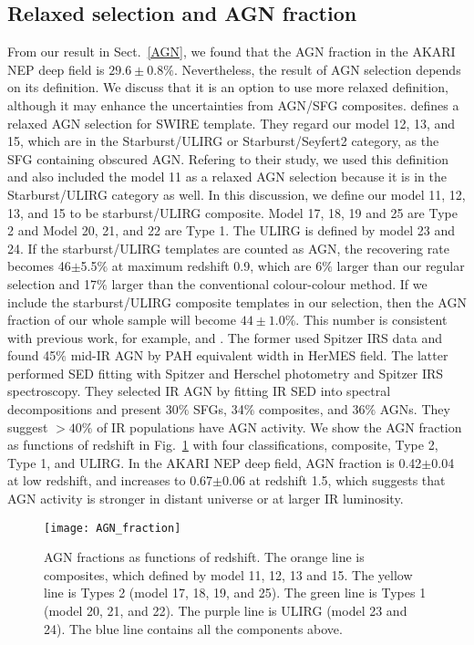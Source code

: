 \documentclass[a4paper,fleqn,usenatbib]{mnras}
\begin{document}
\subsection{Relaxed selection and AGN fraction}
From our result in Sect.~\ref{AGN}, we found that the AGN fraction in the AKARI NEP deep field is $29.6\pm0.8\%$. Nevertheless, the result of AGN selection depends on its definition. We discuss that it is an option to use more relaxed definition, although it may enhance the uncertainties from AGN/SFG composites.  \citet{Gruppioni et al. 2013} defines a relaxed AGN selection for SWIRE template. They regard our model 12, 13, and 15, which are in the Starburst/ULIRG or Starburst/Seyfert2 category, as the SFG containing obscured AGN. Refering to their study, we used this definition and also included the model 11 as a relaxed AGN selection because it is in the Starburst/ULIRG category as well. In this discussion, we define our model 11, 12, 13, and 15 to be starburst/ULIRG composite. Model 17, 18, 19 and 25 are Type 2 and Model 20, 21, and 22 are Type 1. The ULIRG is defined by model 23 and 24. If the starburst/ULIRG templates are counted as AGN, the recovering rate becomes 46$\pm$5.5$\%$ at maximum redshift 0.9, which are 6$\%$ larger than our regular selection and 17$\%$ larger than the conventional colour-colour method. If we include the starburst/ULIRG composite templates in our selection, then the AGN fraction of our whole sample will become $44\pm1.0\%$. This number is consistent with previous work, for example, \citet{Feltre et al. 2013} and \citet{Kirkpatrick et al. 2015}. The former used Spitzer IRS data and found 45$\%$ mid-IR AGN by PAH equivalent width in HerMES field. The latter performed SED fitting with Spitzer and Herschel photometry and Spitzer IRS spectroscopy. They selected IR AGN by fitting IR SED into spectral decompositions and present 30$\%$ SFGs, 34$\%$ composites, and 36$\%$ AGNs. They suggest $>40\%$ of IR populations have AGN activity. We show the AGN fraction as functions of redshift in Fig.~\ref{fig:AGN_fraction} with four classifications, composite, Type 2, Type 1, and ULIRG. In the AKARI NEP deep field, AGN fraction is 0.42$\pm$0.04 at low redshift, and increases to 0.67$\pm$0.06 at redshift 1.5, which suggests that AGN activity is stronger in distant universe or at larger IR luminosity. 

\begin{figure}
	\texttt{[image: AGN\_fraction]}
    \caption{AGN fractions as functions of redshift. The orange line is composites, which defined by model 11, 12, 13 and 15. The yellow line is Types 2 (model 17, 18, 19, and 25). The green line is Types 1 (model 20, 21, and 22). The purple line is ULIRG (model 23 and 24). The blue line contains all the components above.}
    \label{fig:AGN_fraction}
\end{figure} 
\end{document}
